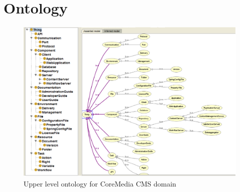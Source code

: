 \chapter{Ontology}

%
%
\begin{figure}[H]
\label{appendix:ontology}
	\includegraphics[width=1.2\textwidth,angle=90,keepaspectratio=true]{img/ontology} 
	\caption[Upper level domain specific ontology]%
           {Upper level ontology for CoreMedia \gls{CMS} domain}
\end{figure}
